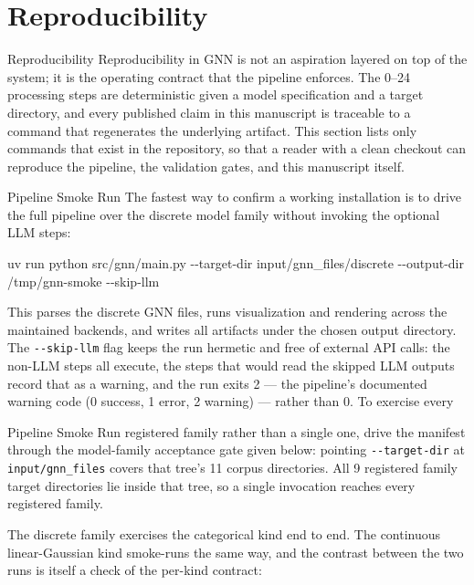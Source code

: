 \documentclass[
  ignorenonframetext,
]{beamer}
\author{\texorpdfstring{}{}}
\date{}
\newenvironment{Shaded}{}{}
\newcommand{\AttributeTok}[1]{\textcolor[rgb]{0.49,0.56,0.16}{#1}}
\newcommand{\ExtensionTok}[1]{#1}
\newcommand{\NormalTok}[1]{#1}
\begin{document}
\section{Reproducibility}\label{sec:reproducibility}

\begin{frame}[allowframebreaks]{Reproducibility}
Reproducibility in GNN is not an aspiration layered on top of the
system; it is the operating contract that the pipeline enforces. The
0--24 processing steps are deterministic given a model specification and
a target directory, and every published claim in this manuscript is
traceable to a command that regenerates the underlying artifact. This
section lists only commands that exist in the repository, so that a
reader with a clean checkout can reproduce the pipeline, the validation
gates, and this manuscript itself.
\end{frame}

\begin{frame}{Pipeline Smoke Run}
\protect{}\label{pipeline-smoke-run}
The fastest way to confirm a working installation is to drive the full
pipeline over the discrete model family without invoking the optional
LLM steps:

\begin{Shaded}
\begin{Highlighting}[]
\ExtensionTok{uv}\NormalTok{ run python src/gnn/main.py }\AttributeTok{{-}{-}target{-}dir}\NormalTok{ input/gnn\_files/discrete }\AttributeTok{{-}{-}output{-}dir}\NormalTok{ /tmp/gnn{-}smoke }\AttributeTok{{-}{-}skip{-}llm}
\end{Highlighting}
\end{Shaded}

This parses the discrete GNN files, runs visualization and rendering
across the maintained backends, and writes all artifacts under the
chosen output directory. The \texttt{-\/-skip-llm} flag keeps the run
hermetic and free of external API calls: the non-LLM steps all execute,
the steps that would read the skipped LLM outputs record that as a
warning, and the run exits 2 --- the pipeline's documented warning code
(0 success, 1 error, 2 warning) --- rather than 0. To exercise every
\end{frame}

\begin{frame}{Pipeline Smoke Run}
registered family rather than a single one, drive the manifest through
the model-family acceptance gate given below: pointing
\texttt{-\/-target-dir} at \texttt{input/gnn\_files} covers that tree's
11 corpus directories. All 9 registered family target directories lie
inside that tree, so a single invocation reaches every registered
family.

The discrete family exercises the categorical kind end to end. The
continuous linear-Gaussian kind smoke-runs the same way, and the
contrast between the two runs is itself a check of the per-kind
contract:

\end{frame}
\end{document}
